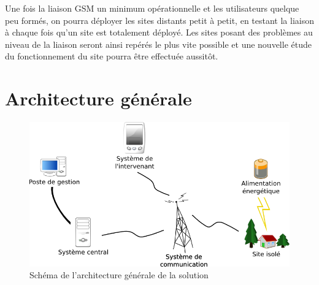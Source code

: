 \documentclass[a4paper, 11pt, draft]{article}
\begin{document}
Une fois la liaison GSM un minimum opérationnelle et les utilisateurs quelque peu formés, on pourra déployer les sites distants petit à petit, en testant la liaison à chaque fois qu'un site est totalement déployé. Les sites posant des problèmes au niveau de la liaison seront ainsi repérés le plus vite possible et une nouvelle étude du fonctionnement du site pourra être effectuée aussitôt.

\newpage

\appendix

\section{Architecture générale}

\begin{figure}[!htp]
\begin{center}
\includegraphics[width=.75\textwidth]{schema_architecture_generale.png}
\caption{Schéma de l'architecture générale de la solution}
\label{figure:schema_archi_generale}
\end{center}
\end{figure}
\end{document}
